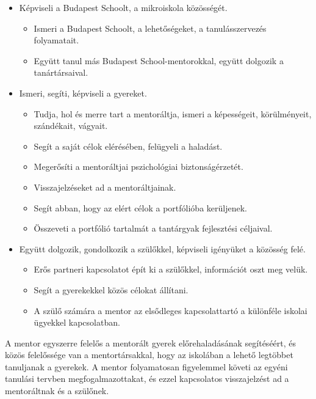 \begin{itemize}
  \item Képviseli a Budapest Schoolt, a mikroiskola közösségét.
        \begin{itemize}
          \item Ismeri a Budapest Schoolt, a lehetőségeket, a tanulásszervezés
                folyamatait.
          \item Együtt tanul más Budapest School-mentorokkal, együtt dolgozik a
                tanártársaival.
        \end{itemize}

  \item Ismeri, segíti, képviseli a gyereket.
        \begin{itemize}
          \item  Tudja, hol és merre tart a mentoráltja, ismeri a képességeit,
                körülményeit, szándékait, vágyait.
          \item    Segít a saját célok elérésében, felügyeli a haladást.
          \item    Megerősíti a mentoráltjai pszichológiai biztonságérzetét.
          \item   Visszajelzéseket ad a mentoráltjainak.
          \item    Segít abban, hogy az elért célok a portfólióba kerüljenek.
          \item    Összeveti a portfólió tartalmát a tantárgyak fejlesztési
                céljaival.
        \end{itemize}

  \item Együtt dolgozik, gondolkozik a szülőkkel, képviseli igényüket a
        közösség felé.
        \begin{itemize}
          \item Erős partneri kapcsolatot épít ki a szülőkkel, információt oszt meg
                velük.
          \item Segít a gyerekekkel közös célokat állítani.
          \item A szülő számára a mentor az elsődleges kapcsolattartó a különféle
                iskolai ügyekkel kapcsolatban.
        \end{itemize}

\end{itemize}

A mentor egyszerre felelős a mentorált gyerek előrehaladásának segítéséért,
és
közös felelőssége van a mentortársakkal, hogy az iskolában a lehető legtöbbet
tanuljanak a gyerekek. A mentor folyamatosan figyelemmel követi az egyéni
tanulási tervben megfogalmazottakat, és ezzel kapcsolatos visszajelzést ad a
mentoráltnak és a szülőnek.

